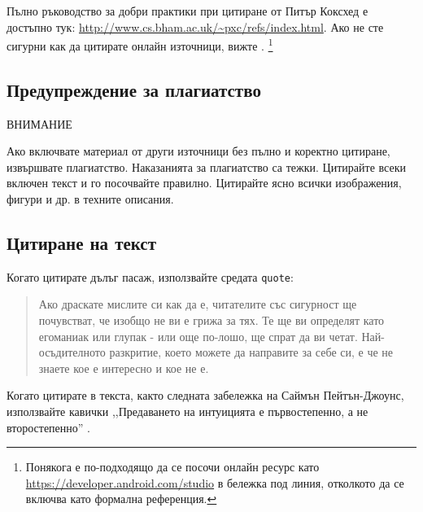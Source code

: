 Пълно ръководство за добри практики при цитиране от Питър Коксхед е достъпно тук: \url{http://www.cs.bham.ac.uk/~pxc/refs/index.html}.
Ако не сте сигурни как да цитирате онлайн източници, вижте \citet{UNSWWebsite}.
\footnote{Понякога е по-подходящо да се посочи онлайн ресурс като \url{https://developer.android.com/studio}
в бележка под линия, отколкото да се включва като формална референция.}

\subsection{Предупреждение за плагиатство}

\begin{highlight_title}{ВНИМАНИЕ}
    
    Ако включвате материал от други източници без пълно и коректно цитиране, извършвате плагиатство. Наказанията за плагиатство са тежки.
    Цитирайте всеки включен текст и го посочвайте правилно. Цитирайте ясно всички изображения, фигури и др. в техните описания.
\end{highlight_title}

\subsection{Цитиране на текст}

Когато цитирате дълъг пасаж, използвайте средата \texttt{quote}:

\begin{quote}
    Ако драскате мислите си как да е, читателите със сигурност ще почувстват, че изобщо не ви е грижа за тях. Те ще ви определят като егоманиак или глупак - или още по-лошо, ще спрат да ви четат. Най-осъдителното разкритие, което можете да направите за себе си, е че не знаете кое е интересно и кое не е.
\end{quote} \citep{Von80}

Когато цитирате в текста, както следната забележка на Саймън Пейтън-Джоунс, използвайте кавички ,,Предаването на интуицията е първостепенно, а не второстепенно'' \citep{Pey17}.